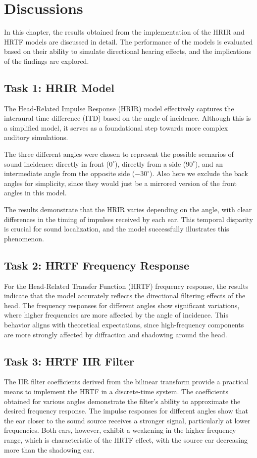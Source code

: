 \chapter{Discussions}

In this chapter, the results obtained from the implementation of the HRIR and HRTF models are discussed in detail. The performance of the models is evaluated based on their ability to simulate directional hearing effects, and the implications of the findings are explored. 

\section{Task 1: HRIR Model}
The Head-Related Impulse Response (HRIR) model effectively captures the interaural time difference (ITD) based on the angle of incidence. Although this is a simplified model, it serves as a foundational step towards more complex auditory simulations.

The three different angles were chosen to represent the possible scenarios of sound incidence: directly in front (\(0^\circ\)), directly from a side (\(90^\circ\)), and an intermediate angle from the opposite side (\(-30^\circ\)). Also here we exclude the back angles for simplicity, since they would just be a mirrored version of the front angles in this model.

The results demonstrate that the HRIR varies depending on the angle, with clear differences in the timing of impulses received by each ear. This temporal disparity is crucial for sound localization, and the model successfully illustrates this phenomenon. 

\section{Task 2: HRTF Frequency Response}
For the Head-Related Transfer Function (HRTF) frequency response, the results indicate that the model accurately reflects the directional filtering effects of the head. The frequency responses for different angles show significant variations, where higher frequencies are more affected by the angle of incidence. This behavior aligns with theoretical expectations, since high-frequency components are more strongly affected by diffraction and shadowing around the head. 

\section{Task 3: HRTF IIR Filter}
The IIR filter coefficients derived from the bilinear transform provide a practical means to implement the HRTF in a discrete-time system. The coefficients obtained for various angles demonstrate the filter's ability to approximate the desired frequency response. The impulse responses for different angles show that the ear closer to the sound source receives a stronger signal, particularly at lower frequencies. Both ears, however, exhibit a weakening in the higher frequency range, which is characteristic of the HRTF effect, with the source ear decreasing more than the shadowing ear.

